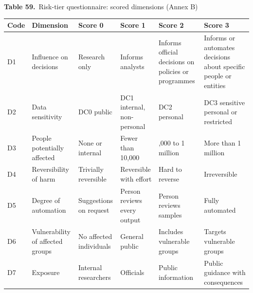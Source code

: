 \documentclass[border=10pt]{standalone}
\begin{document}
\begin{minipage}{22cm}
{\large\bfseries Table 59.}\ {\large Risk-tier questionnaire: scored dimensions (Annex B)}\par\vspace{7pt}
\small
{}
\begin{tabularx}{\linewidth}{@{}>{\hsize=0.424\hsize\raggedright\arraybackslash}X>{\hsize=1.341\hsize\raggedright\arraybackslash}X>{\hsize=1.059\hsize\raggedright\arraybackslash}X>{\hsize=1.059\hsize\raggedright\arraybackslash}X>{\hsize=1.059\hsize\raggedright\arraybackslash}X>{\hsize=1.059\hsize\raggedright\arraybackslash}X@{}}
\arrayrulecolor{bapilrule}\toprule
\rowcolor{white}\textbf{Code} & \textbf{Dimension} & \textbf{Score 0} & \textbf{Score 1} & \textbf{Score 2} & \textbf{Score 3} \\
\midrule
D1 & Influence on decisions & Research only & Informs analysts & Informs official decisions on policies or programmes & Informs or automates decisions about specific people or entities \\
D2 & Data sensitivity & DC0 public & DC1 internal, non-personal & DC2 personal & DC3 sensitive personal or restricted \\
D3 & People potentially affected & None or internal & Fewer than 10,000 & 10,000 to 1 million & More than 1 million \\
D4 & Reversibility of harm & Trivially reversible & Reversible with effort & Hard to reverse & Irreversible \\
D5 & Degree of automation & Suggestions on request & Person reviews every output & Person reviews samples & Fully automated \\
D6 & Vulnerability of affected groups & No affected individuals & General public & Includes vulnerable groups & Targets vulnerable groups \\
D7 & Exposure & Internal researchers & Officials & Public information & Public guidance with consequences \\
\bottomrule
\end{tabularx}
\par\vspace{5pt}{\footnotesize\itshape Tier rules: any prohibited-use flag gives T0. Otherwise T3 if total at least 13, or D1 = 3, or D2 = 3, or both D2 and D3 at least 2; T2 if total at least 6, or D1 = 2, or D7 at least 2; else T1. Implemented in bapil.risk.}
\par{}
\end{minipage}
\end{document}
